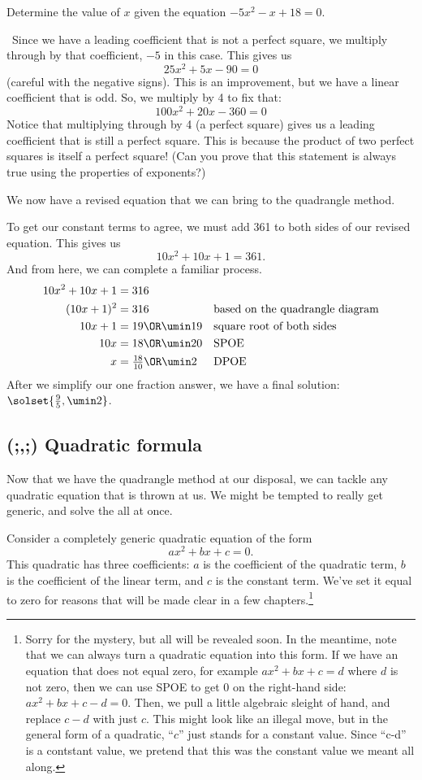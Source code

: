 \begin{boxex}
Determine the value of $x$ given the equation $-5x^2-x+18=0$.

\exsoln\ Since we have a leading coefficient that is not a perfect square, we multiply through by that coefficient, $-5$ in this case. This gives us
\[25x^2+5x-90=0\]
(careful with the negative signs). This is an improvement, but we have a linear coefficient that is odd. So, we multiply by 4 to fix that:
\[100x^2 + 20x - 360=0\]
Notice that multiplying through by 4 (a perfect square) gives us a leading coefficient that is still a perfect square. This is because the product of two perfect squares is itself a perfect square! (Can you prove that this statement is always true using the properties of exponents?)

We now have a revised equation that we can bring to the quadrangle method.


To get our constant terms to agree, we must add 361 to both sides of our revised equation. This gives us
\[10x^2 + 10x + 1 = 361.\]
And from here, we can complete a familiar process.
\begin{align*}
10x^2 +10x + 1 &= 316
&&\text{}
\\
(10x+1)^2 &= 316
&&\text{based on the quadrangle diagram}
\\
10x+1 &= 19 \OR \umin19
&&\text{square root of both sides}
\\
10x &= 18 \OR \umin20
&&\text{SPOE}
\\
x &= \tfrac{18}{10} \OR \umin2
&&\text{DPOE}
\end{align*}
After we simplify our one fraction answer, we have a final solution: $\solset{\frac{9}{5}, \umin2}$.
\end{boxex}

\subsection{(;,;) Quadratic formula}
\label{sec:quadformulapreview}

Now that we have the quadrangle method at our disposal, we can tackle any quadratic equation that is thrown at us. We might be tempted to really get generic, and solve the all at once.

Consider a completely generic quadratic equation of the form \[ax^2 + bx + c=0.\] This quadratic has three coefficients: $a$ is the coefficient of the quadratic term, $b$ is the coefficient of the linear term, and $c$ is the constant term. We've set it equal to zero for reasons that will be made clear in a few chapters.\footnote{Sorry for the mystery, but all will be revealed soon. In the meantime, note that we can always turn a quadratic equation into this form. If we have an equation that does not equal zero, for example $ax^2 + bx + c = d$ where $d$ is not zero, then we can use SPOE to get 0 on the right-hand side: $ax^2+bx+c-d=0$. Then, we pull a little algebraic sleight of hand, and replace $c-d$ with just $c$. This might look like an illegal move, but in the general form of a quadratic, ``$c$'' just stands for a constant value. Since ``c-d'' is a contstant value, we pretend that this was the constant value we meant all along.}

